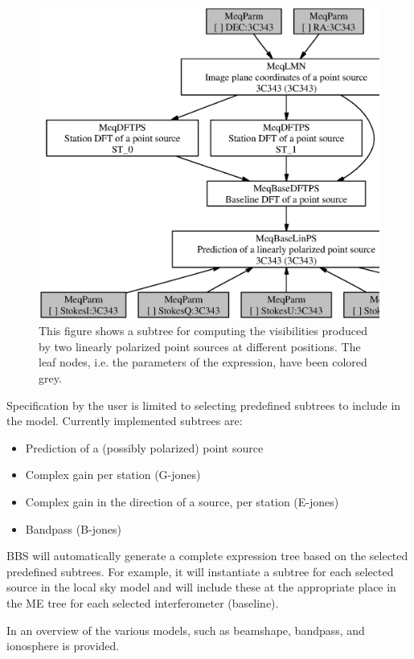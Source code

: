 \documentclass[10pt]{lofar}
\newcommand{\bbs}{BBS\xspace}
\newcommand{\me}{ME\xspace}
\begin{document}
\begin{figure}[htbp]
\centering
\includegraphics[width=\textwidth]{images/expr_graph_sdd.ps}
\caption{This figure shows a subtree for computing the visibilities produced by
two linearly polarized point sources at different positions. The leaf nodes,
i.e. the parameters of the expression, have been colored grey.}
\label{fig:expr_tree}
\end{figure}

Specification by the user is limited to selecting predefined subtrees to include
in the model. Currently implemented subtrees are:
\begin{itemize}
\item Prediction of a (possibly polarized) point source
\item Complex gain per station (G-jones)
\item Complex gain in the direction of a source, per station (E-jones)
\item Bandpass (B-jones)
\end{itemize}

\bbs will automatically generate a complete expression tree based on the
selected predefined subtrees. For example, it will instantiate a subtree for
each selected source in the local sky model and will include these at the
appropriate place in the \me tree for each selected interferometer (baseline).

In \cite[sec. 2]{LOFAR-ASTRON-SDD-050} an overview of the various models, such
as beamshape, bandpass, and ionosphere is provided. 
\end{document}
